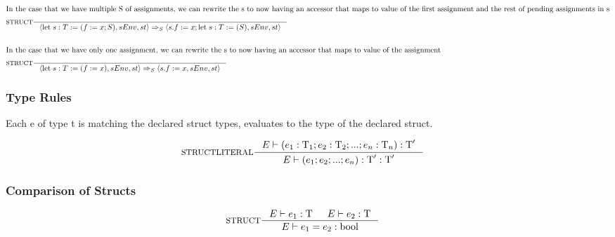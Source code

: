 \begin{align*}
\intertext{In the case that we have multiple S of assignments, we can rewrite the s to now having an accessor that maps to value of the first assignment and the rest of pending assignments in s}
&\inference[$\text{STRUCT}$]{}
                            {\Braket{\Tlet \; s:T := (f := x;S),sEnv,st} \Rightarrow_S \Braket{s.f := x;\Tlet \; s:T := (S),sEnv,st}}
\\\\
\intertext{In the case that we have only one assignment, we can rewrite the s to now having an accessor that maps to value of the assignment}
&\inference[$\text{STRUCT}$]{}
                            {\Braket{\Tlet \; s:T := (f := x),sEnv,st} \Rightarrow_S \Braket{s.f := x,sEnv,st}}
\end{align*}

\subsubsection{Type Rules}

Each e of type t is matching the declared struct types, evaluates to the type of the declared struct.

\begin{align*}
&\inference[STRUCTLITERAL]{\Tenv (e_1 : \Tt_1;e_2 : \Tt_2;...;e_n : \Tt_n):\Tt'}
                 {\Tenv \mathbin{\text{(}} e_1; e_2;...;e_n\mathbin{\text{)}}:\Tt': \Tt'}
\end{align*}

\subsubsection{Comparison of Structs}
\begin{align*}
&\inference[STRUCT]{\Tenv e_1: \Tt & \Tenv e_2: \Tt}
                 {\Tenv e_1 = e_2: \Tbool}
\end{align*}
